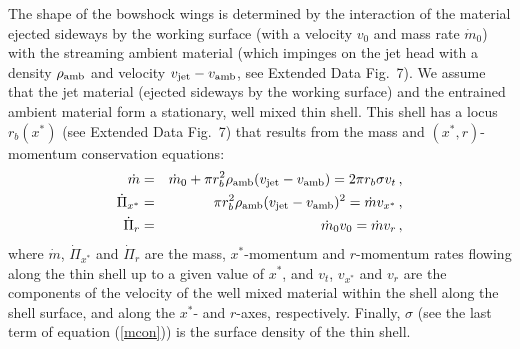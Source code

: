 \documentclass[12pt]{mythesis}
\begin{document}
The shape of the bowshock wings is determined by the interaction of the material ejected sideways by the working surface (with a velocity $v_0$ and mass rate ${\dot m_0}$) with the streaming ambient material (which impinges on the jet head with a density $\rho_{\rm amb}$ and velocity $v_{\rm jet}-v_{\rm amb}$, 
see Extended Data Fig.~7). We assume that the jet material (ejected sideways by the working surface) and the entrained ambient material form a stationary, well mixed thin shell. This shell has a locus $r_b(x^*)$ 
(see Extended Data Fig.~7) that results from the mass and $(x^*,r)$-momentum conservation equations:
\begin{eqnarray}
	{\dot m} & = & {\dot m}_0+\pi r_b^2 \rho_{\rm amb}(v_{\rm jet}-v_{\rm amb})=2\pi r_b \sigma v_t\,, \label{mcon} \\ 
	{\dot \Pi}_{x^*} & = & \pi r_b^2\rho_{\rm amb}(v_{\rm jet}-v_{\rm amb})^2={\dot m} v_{x^*}\,, \label{xcon} \\
  {\dot \Pi}_r & = & {\dot m_0}v_0={\dot m}v_r\,,
  \label{rcon}
\end{eqnarray}
where ${\dot m}$, ${\dot \Pi}_{x^*}$ and ${\dot \Pi}_r$ are the mass, $x^*$-momentum and $r$-momentum rates flowing along the thin shell up to a given value of $x^*$, and $v_t$, $v_{x^*}$ and $v_r$ are the components of the velocity of the well mixed material within the shell along the shell surface, and along the $x^*$- and $r$-axes, respectively. Finally, $\sigma$ (see the last term of equation (\ref{mcon})) is the surface density of the thin shell.
\end{document}
